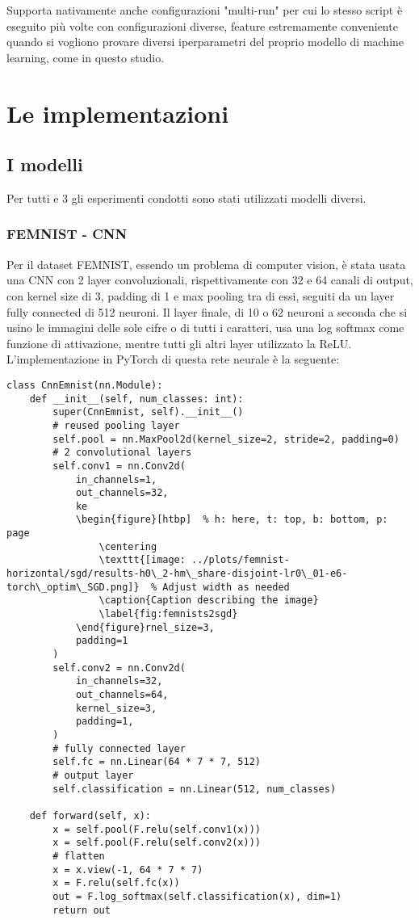 Supporta nativamente anche configurazioni "multi-run" per cui lo stesso 
script è eseguito più volte con configurazioni diverse, feature 
estremamente conveniente quando si vogliono provare diversi iperparametri
del proprio modello di machine learning, come in questo studio.

\section{Le implementazioni}
\subsection{I modelli}
Per tutti e 3 gli esperimenti condotti sono stati utilizzati modelli 
diversi.

\subsubsection{FEMNIST - CNN}
Per il dataset FEMNIST, essendo un problema di computer vision, è stata 
usata una CNN con 2 layer convoluzionali, rispettivamente con 32 e 
64 canali di output, con kernel size di 3, padding di 1
e max pooling tra di essi, seguiti da un layer fully connected 
di 512 neuroni. Il layer finale, di 10 o 62 neuroni a seconda che si 
usino le immagini delle sole cifre o di tutti i caratteri, usa una 
log softmax come funzione di attivazione, mentre tutti gli altri layer 
utilizzato la ReLU. L'implementazione in PyTorch di questa rete neurale
è la seguente:

\begin{lstlisting}
class CnnEmnist(nn.Module):
    def __init__(self, num_classes: int):
        super(CnnEmnist, self).__init__()
        # reused pooling layer
        self.pool = nn.MaxPool2d(kernel_size=2, stride=2, padding=0)
        # 2 convolutional layers
        self.conv1 = nn.Conv2d(
            in_channels=1,
            out_channels=32,
            ke
            \begin{figure}[htbp]  % h: here, t: top, b: bottom, p: page
                \centering
                \texttt{[image: ../plots/femnist-horizontal/sgd/results-h0\_2-hm\_share-disjoint-lr0\_01-e6-torch\_optim\_SGD.png]}  % Adjust width as needed
                \caption{Caption describing the image}
                \label{fig:femnists2sgd}
            \end{figure}rnel_size=3,
            padding=1
        )
        self.conv2 = nn.Conv2d(
            in_channels=32,
            out_channels=64,
            kernel_size=3,
            padding=1,
        )
        # fully connected layer
        self.fc = nn.Linear(64 * 7 * 7, 512)
        # output layer
        self.classification = nn.Linear(512, num_classes)

    def forward(self, x):
        x = self.pool(F.relu(self.conv1(x)))
        x = self.pool(F.relu(self.conv2(x)))
        # flatten
        x = x.view(-1, 64 * 7 * 7)
        x = F.relu(self.fc(x))
        out = F.log_softmax(self.classification(x), dim=1)
        return out
\end{lstlisting}


